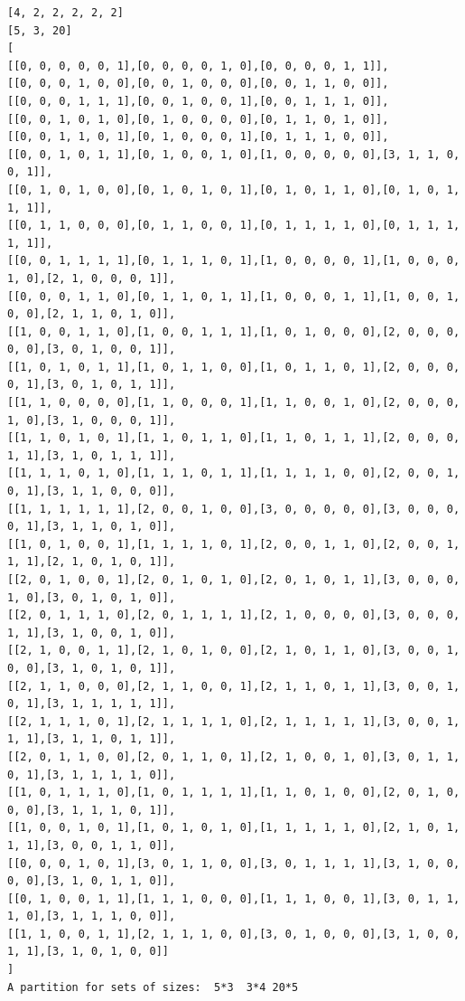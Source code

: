 \documentclass[final]{dmtcs-episciences}
\begin{document}
\begin{appendices}
\newpage

\begin{verbatim} 
[4, 2, 2, 2, 2, 2]
[5, 3, 20]
[
[[0, 0, 0, 0, 0, 1],[0, 0, 0, 0, 1, 0],[0, 0, 0, 0, 1, 1]],
[[0, 0, 0, 1, 0, 0],[0, 0, 1, 0, 0, 0],[0, 0, 1, 1, 0, 0]],
[[0, 0, 0, 1, 1, 1],[0, 0, 1, 0, 0, 1],[0, 0, 1, 1, 1, 0]],
[[0, 0, 1, 0, 1, 0],[0, 1, 0, 0, 0, 0],[0, 1, 1, 0, 1, 0]],
[[0, 0, 1, 1, 0, 1],[0, 1, 0, 0, 0, 1],[0, 1, 1, 1, 0, 0]],
[[0, 0, 1, 0, 1, 1],[0, 1, 0, 0, 1, 0],[1, 0, 0, 0, 0, 0],[3, 1, 1, 0, 0, 1]],
[[0, 1, 0, 1, 0, 0],[0, 1, 0, 1, 0, 1],[0, 1, 0, 1, 1, 0],[0, 1, 0, 1, 1, 1]],
[[0, 1, 1, 0, 0, 0],[0, 1, 1, 0, 0, 1],[0, 1, 1, 1, 1, 0],[0, 1, 1, 1, 1, 1]],
[[0, 0, 1, 1, 1, 1],[0, 1, 1, 1, 0, 1],[1, 0, 0, 0, 0, 1],[1, 0, 0, 0, 1, 0],[2, 1, 0, 0, 0, 1]],
[[0, 0, 0, 1, 1, 0],[0, 1, 1, 0, 1, 1],[1, 0, 0, 0, 1, 1],[1, 0, 0, 1, 0, 0],[2, 1, 1, 0, 1, 0]],
[[1, 0, 0, 1, 1, 0],[1, 0, 0, 1, 1, 1],[1, 0, 1, 0, 0, 0],[2, 0, 0, 0, 0, 0],[3, 0, 1, 0, 0, 1]],
[[1, 0, 1, 0, 1, 1],[1, 0, 1, 1, 0, 0],[1, 0, 1, 1, 0, 1],[2, 0, 0, 0, 0, 1],[3, 0, 1, 0, 1, 1]],
[[1, 1, 0, 0, 0, 0],[1, 1, 0, 0, 0, 1],[1, 1, 0, 0, 1, 0],[2, 0, 0, 0, 1, 0],[3, 1, 0, 0, 0, 1]],
[[1, 1, 0, 1, 0, 1],[1, 1, 0, 1, 1, 0],[1, 1, 0, 1, 1, 1],[2, 0, 0, 0, 1, 1],[3, 1, 0, 1, 1, 1]],
[[1, 1, 1, 0, 1, 0],[1, 1, 1, 0, 1, 1],[1, 1, 1, 1, 0, 0],[2, 0, 0, 1, 0, 1],[3, 1, 1, 0, 0, 0]],
[[1, 1, 1, 1, 1, 1],[2, 0, 0, 1, 0, 0],[3, 0, 0, 0, 0, 0],[3, 0, 0, 0, 0, 1],[3, 1, 1, 0, 1, 0]],
[[1, 0, 1, 0, 0, 1],[1, 1, 1, 1, 0, 1],[2, 0, 0, 1, 1, 0],[2, 0, 0, 1, 1, 1],[2, 1, 0, 1, 0, 1]],
[[2, 0, 1, 0, 0, 1],[2, 0, 1, 0, 1, 0],[2, 0, 1, 0, 1, 1],[3, 0, 0, 0, 1, 0],[3, 0, 1, 0, 1, 0]],
[[2, 0, 1, 1, 1, 0],[2, 0, 1, 1, 1, 1],[2, 1, 0, 0, 0, 0],[3, 0, 0, 0, 1, 1],[3, 1, 0, 0, 1, 0]],
[[2, 1, 0, 0, 1, 1],[2, 1, 0, 1, 0, 0],[2, 1, 0, 1, 1, 0],[3, 0, 0, 1, 0, 0],[3, 1, 0, 1, 0, 1]],
[[2, 1, 1, 0, 0, 0],[2, 1, 1, 0, 0, 1],[2, 1, 1, 0, 1, 1],[3, 0, 0, 1, 0, 1],[3, 1, 1, 1, 1, 1]],
[[2, 1, 1, 1, 0, 1],[2, 1, 1, 1, 1, 0],[2, 1, 1, 1, 1, 1],[3, 0, 0, 1, 1, 1],[3, 1, 1, 0, 1, 1]],
[[2, 0, 1, 1, 0, 0],[2, 0, 1, 1, 0, 1],[2, 1, 0, 0, 1, 0],[3, 0, 1, 1, 0, 1],[3, 1, 1, 1, 1, 0]],
[[1, 0, 1, 1, 1, 0],[1, 0, 1, 1, 1, 1],[1, 1, 0, 1, 0, 0],[2, 0, 1, 0, 0, 0],[3, 1, 1, 1, 0, 1]],
[[1, 0, 0, 1, 0, 1],[1, 0, 1, 0, 1, 0],[1, 1, 1, 1, 1, 0],[2, 1, 0, 1, 1, 1],[3, 0, 0, 1, 1, 0]],
[[0, 0, 0, 1, 0, 1],[3, 0, 1, 1, 0, 0],[3, 0, 1, 1, 1, 1],[3, 1, 0, 0, 0, 0],[3, 1, 0, 1, 1, 0]],
[[0, 1, 0, 0, 1, 1],[1, 1, 1, 0, 0, 0],[1, 1, 1, 0, 0, 1],[3, 0, 1, 1, 1, 0],[3, 1, 1, 1, 0, 0]],
[[1, 1, 0, 0, 1, 1],[2, 1, 1, 1, 0, 0],[3, 0, 1, 0, 0, 0],[3, 1, 0, 0, 1, 1],[3, 1, 0, 1, 0, 0]]
]
A partition for sets of sizes:  5*3  3*4 20*5
\end{verbatim}
\newpage


\end{appendices}
\end{document}
